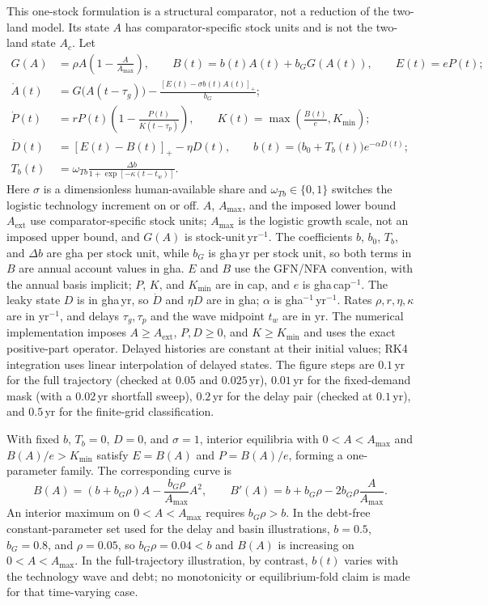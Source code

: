 \documentclass[11pt,a4paper]{article}
\newcommand{\pos}[1]{\left[#1\right]_+}
\begin{document}
This one-stock formulation is a structural comparator, not a reduction of the two-land model. Its state $A$ has comparator-specific stock units and is not the two-land state $A_c$. Let
\begin{align*}
G(A)&=\rho A\left(1-\frac{A}{A_{\max}}\right),\qquad
B(t)=b(t)A(t)+b_GG(A(t)),\qquad E(t)=eP(t);\\
\dot A(t)&=G\bigl(A(t-\tau_g)\bigr)-\frac{\pos{E(t)-\sigma b(t)A(t)}}{b_G};\\
\dot P(t)&=rP(t)\left(1-\frac{P(t)}{K(t-\tau_p)}\right),\qquad
K(t)=\max\!\left(\frac{B(t)}{e},K_{\min}\right);\\
\dot D(t)&=\pos{E(t)-B(t)}-\eta D(t),\qquad
b(t)=\bigl(b_0+T_b(t)\bigr)e^{-\alpha D(t)};\\
T_b(t)&=\omega_{Tb}\frac{\Delta b}{1+\exp[-\kappa(t-t_w)]}.
\end{align*}
Here $\sigma$ is a dimensionless human-available share and $\omega_{Tb}\in\{0,1\}$ switches the logistic technology increment on or off. $A$, $A_{\max}$, and the imposed lower bound $A_{\mathrm{ext}}$ use comparator-specific stock units; $A_{\max}$ is the logistic growth scale, not an imposed upper bound, and $G(A)$ is stock-unit\,yr$^{-1}$.  The coefficients $b$, $b_0$, $T_b$, and $\Delta b$ are gha per stock unit, while $b_G$ is gha\,yr per stock unit, so both terms in $B$ are annual account values in gha. $E$ and $B$ use the GFN/NFA convention, with the annual basis implicit; $P$, $K$, and $K_{\min}$ are in cap, and $e$ is gha\,cap$^{-1}$. The leaky state $D$ is in gha\,yr, so $\dot D$ and $\eta D$ are in gha; $\alpha$ is gha$^{-1}$\,yr$^{-1}$. Rates $\rho,r,\eta,\kappa$ are in yr$^{-1}$, and delays $\tau_g,\tau_p$ and the wave midpoint $t_w$ are in yr. The numerical implementation imposes $A\ge A_{\mathrm{ext}}$, $P,D\ge0$, and $K\ge K_{\min}$ and uses the exact positive-part operator. Delayed histories are constant at their initial values; RK4 integration uses linear interpolation of delayed states. The figure steps are $0.1$\,yr for the full trajectory (checked at $0.05$ and $0.025$\,yr), $0.01$\,yr for the fixed-demand mask (with a $0.02$\,yr shortfall sweep), $0.2$\,yr for the delay pair (checked at $0.1$\,yr), and $0.5$\,yr for the finite-grid classification.

With fixed $b$, $T_b=0$, $D=0$, and $\sigma=1$, interior equilibria with $0<A<A_{\max}$ and $B(A)/e>K_{\min}$ satisfy $E=B(A)$ and $P=B(A)/e$, forming a one-parameter family. The corresponding curve is
\[
B(A)=(b+b_G\rho)A-\frac{b_G\rho}{A_{\max}}A^2,\qquad
B'(A)=b+b_G\rho-2b_G\rho\frac{A}{A_{\max}}.
\]
An interior maximum on $0<A<A_{\max}$ requires $b_G\rho>b$. In the debt-free constant-parameter set used for the delay and basin illustrations, $b=0.5$, $b_G=0.8$, and $\rho=0.05$, so $b_G\rho=0.04<b$ and $B(A)$ is increasing on $0<A<A_{\max}$. In the full-trajectory illustration, by contrast, $b(t)$ varies with the technology wave and debt; no monotonicity or equilibrium-fold claim is made for that time-varying case.
\end{document}
